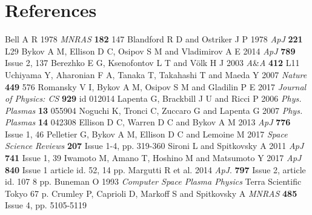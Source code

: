 \documentclass[a4paper]{jpconf}
\begin{document}
\section*{References}
\begin{thebibliography}{20}
	 Bell A R 1978 \textit{MNRAS} \textbf{182} 147
	 Blandford R D and Ostriker J P 1978 \textit{ApJ} \textbf{221} L29 
	 Bykov A M, Ellison D C, Osipov S M and Vladimirov A E 2014 \textit{ApJ} \textbf{789} Issue 2, 137
	 Berezhko E G, Ksenofontov L T and V{\"o}lk H J  2003 \textit{A}{\&}\textit{A} \textbf{412} L11
	 Uchiyama Y, Aharonian F A, Tanaka T, Takahashi T and Maeda Y 2007 \textit{Nature} \textbf{449} 576
	 Romansky V I, Bykov A M, Osipov S M and Gladilin P E 2017 \textit{Journal of Physics: CS} \textbf{929} id 012014 
	 Lapenta G, Brackbill J U and Ricci P 2006 \textit{Phys. Plasmas} \textbf{13} 055904
	 Noguchi K, Tronci C, Zuccaro G and Lapenta G 2007 \textit{Phys. Plasmas} \textbf{14} 042308
	 Ellison D C, Warren D C and Bykov A M 2013 \textit{ApJ} \textbf{776} Issue 1, 46
	 Pelletier G, Bykov A M, Ellison D C and Lemoine M 2017 \textit{Space Science Reviews} \textbf{207} Issue 1-4, pp. 319-360
	 Sironi L and Spitkovsky A 2011 \textit{ApJ} \textbf{741} Issue 1, 39
	 Iwamoto M, Amano T, Hoshino M and Matsumoto Y 2017 \textit{ApJ} \textbf{840} Issue 1 article id. 52, 14 pp.
	 Margutti R et al. 2014 \textit{ApJ}. \textbf{797} Issue 2, article id. 107 8 pp.
	 Buneman O 1993 \textit{Computer Space Plasma Physics} Terra Scientific Tokyo  67 p.
	 Crumley P, Caprioli D, Markoff S and Spitkovsky A \textit{MNRAS} \textbf{485} Issue 4, pp. 5105-5119
	
\end{thebibliography}
\end{document}
